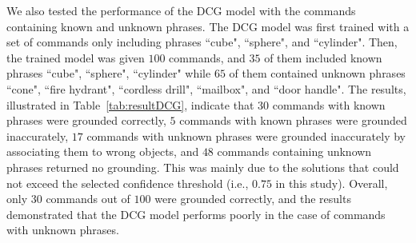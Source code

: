 We also tested the performance of the DCG model with the commands containing known and unknown phrases. The DCG model was first trained with a set of commands only including phrases  ``cube", ``sphere", and ``cylinder". Then, the trained model was given $100$ commands, and $35$ of them included known phrases ``cube", ``sphere", ``cylinder" while $65$ of them contained unknown phrases ``cone", ``fire hydrant", ``cordless drill", ``mailbox", and ``door handle". The results, illustrated in Table~\ref{tab:resultDCG}, indicate that $30$ commands with known phrases were grounded correctly, $5$ commands with known phrases were grounded inaccurately, $17$ commands with unknown phrases were grounded inaccurately by associating them to wrong objects, and $48$ commands containing unknown phrases returned no grounding. This was mainly due to the solutions that could not exceed the selected confidence threshold (i.e., $0.75$ in this study). Overall, only $30$ commands out of $100$ were grounded correctly, and the results demonstrated that the DCG model performs poorly in the case of commands with unknown phrases. 



\begin{table}[htb!]
\centering
{}
\caption{The summary of results showing the fraction of accurate, inaccurate, and uninformed groundings of $100$ commands.}\label{tab:resultDCG}
\end{table}

